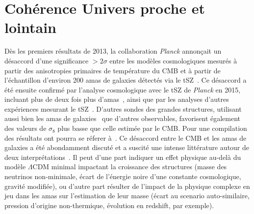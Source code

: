 \section{Cohérence Univers proche et lointain}
\label{se:cosmo_tensions}

Dès les premiers résultats de 2013, la
collaboration \emph{Planck} annonçait un désaccord
d'une significance $>2\sigma$ entre les modèles cosmologiques mesurés
à partir des anisotropies primaires de température du CMB et à partir de
l'échantillon d'environ 200 amas de galaxies détectés via le
tSZ~\citep{Planck_2014_SZ_Cosmo, Planck_2014_ymap}. Ce désaccord a été
ensuite confirmé par l'analyse cosmologique avec le tSZ
de \emph{Planck} en 2015, incluant plus de deux fois plus
d'amas~\citep{Planck_2016_SZ_cosmo, Planck2016_ymap}, ainsi que par
les analyses d'autres expériences mesurant le
tSZ~\citep[\emph{e.g.}][]{Hasselfield2013_ACT_SZ,
deHaan2016}. D'autres sondes des grandes structures, utilisant aussi
bien les amas de galaxies~\citep[\emph{e.g.}][]{Bohringer2014,
Pacaud2018} que d'autres observables, favorisent également des valeurs
de $\sigma_8$ plus basse que celle estimée par le CMB. Pour une
compilation des résultats ont pourra se réferer à~\citet{Salvati2018}.
Ce désaccord entre le CMB et les amas de galaxies a été
abondamment discuté et a suscité une intense littérature autour de
deux interprétations~\citep[voir \emph{e.g.}][pour un
résumé]{Planck_2016_SZ_cosmo, Salvati2018}. Il peut d'une part
indiquer un effet physique au-delà du modèle $\Lambda$CDM minimal
impactant la croissance des structures (masse des neutrinos
non-minimale, écart de l'énergie noire d'une constante cosmologique,
gravité modifiée), ou d'autre part résulter de l'impact de la
physique complexe en jeu dans les amas sur l'estimation de leur masse
(écart au scenario auto-similaire, pression d'origine non-thermique,
évolution en redshift, par exemple).    

